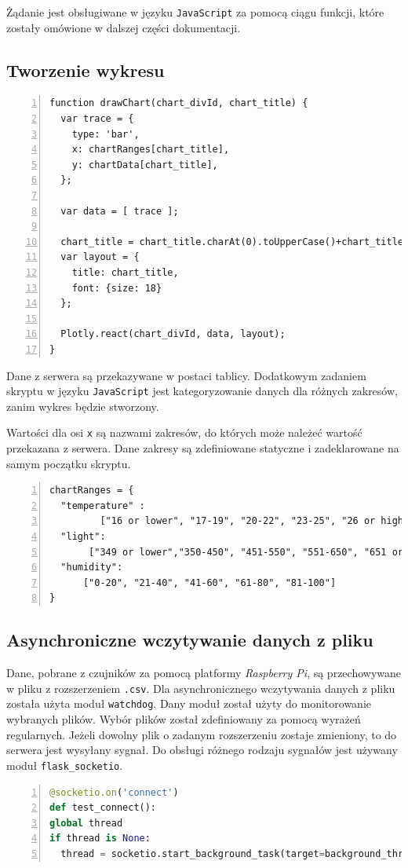 \documentclass[a4paper]{article}
\begin{document}
	Żądanie jest obsługiwane w języku \texttt{JavaScript} za pomocą ciągu funkcji, które zostały omówione w dalszej części dokumentacji.

    \subsection{Tworzenie wykresu}
    \begin{lstlisting}[frame=single, numbers=left, basicstyle=\ttfamily\small,
    caption={Funkcja do tworzenia histogramu za pomocą biblioteki \textsl{Plotly.js}}]
function drawChart(chart_divId, chart_title) {
  var trace = {
    type: 'bar',
    x: chartRanges[chart_title],
    y: chartData[chart_title],
  };

  var data = [ trace ];

  chart_title = chart_title.charAt(0).toUpperCase()+chart_title.slice(1);
  var layout = {
    title: chart_title,
    font: {size: 18}
  };

  Plotly.react(chart_divId, data, layout);
}
    \end{lstlisting}

    Dane z serwera są przekazywane w postaci tablicy. 
    Dodatkowym zadaniem skryptu w języku \texttt{JavaScript} jest kategoryzowanie danych
    dla różnych zakresów, zanim wykres będzie stworzony.

    Wartości dla osi \texttt{x} są nazwami zakresów, 
    do których może należeć wartość przekazana z serwera. 
    Dane zakresy są zdefiniowane statyczne i zadeklarowane na samym początku skryptu.
    \begin{lstlisting}[frame=single, numbers=left, basicstyle=\ttfamily\small,
caption={Zdefiniowany zakresy w skrypcie \texttt{JavaScript}}]
chartRanges = {
  "temperature" :
	     ["16 or lower", "17-19", "20-22", "23-25", "26 or higher"],
  "light": 
       ["349 or lower","350-450", "451-550", "551-650", "651 or higher"],
  "humidity":
	  ["0-20", "21-40", "41-60", "61-80", "81-100"]
}
    \end{lstlisting}

\subsection{Asynchroniczne wczytywanie danych z pliku}
    Dane, pobrane z czujników za pomocą platformy \textit{Raspberry Pi}, są przechowywane w pliku z rozszerzeniem \texttt{.csv}.
    Dla asynchronicznego wczytywania danych z pliku została użyta moduł \texttt{watchdog}.
    Dany moduł został użyty do monitorowanie wybranych plików. 
    Wybór plików został zdefiniowany za pomocą wyrażeń regularnych. 
    Jeżeli dowolny plik o zadanym rozszerzeniu zostaje zmieniony, to do serwera jest wysyłany sygnał.
    Do obsługi różnego rodzaju sygnałów jest używany moduł \texttt{flask\_socketio}.
    \begin{lstlisting}[frame=single, numbers=left, basicstyle=\ttfamily\small, language=python,
    caption={Połączenie gniazdka na serwerze z gniazdkiem w przeglądrce}]
@socketio.on('connect')
def test_connect():
global thread
if thread is None:
  thread = socketio.start_background_task(target=background_thread)
    \end{lstlisting}
\end{document}
